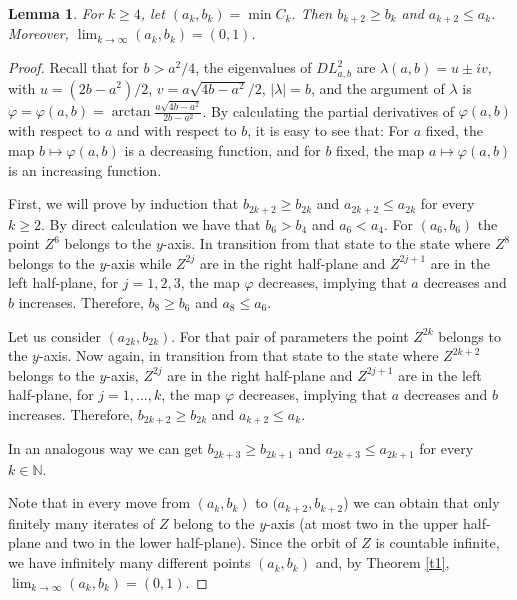 \documentclass[12pt]{amsart}
\theoremstyle{plain}
\newtheorem{lem}[theorem]{Lemma}
\theoremstyle{definition}
\def\N{{\mathbb N}}
\renewcommand{\phi}{\varphi}
\begin{document}
	\begin{lem}\label{l:ps}
		For $k \ge 4$, let $(a_k, b_k) = \min C_k$. Then $b_{k+2} \ge b_k$ and 
		$a_{k+2} \le a_k$. Moreover, $\lim_{k \to \infty}(a_k, b_k) = (0, 1)$.
	\end{lem}
	\begin{proof}
		Recall that for $b > a^2/4$, the eigenvalues of $DL^2_{a,b}$ are 
		$\lambda(a, b) = u \pm iv$, with $u = (2b - a^2)/2$, 
		$v = a\sqrt{4b-a^2}/2$, $|\lambda| = b$, and the argument of $\lambda$ 
		is $\phi = \phi(a,b) = \arctan \frac{a\sqrt{4b - a^2}}{2b - a^2}$. By 
		calculating the partial derivatives of $\phi(a,b)$ with respect to $a$ 
		and with respect to $b$, it is easy to see that: For $a$ fixed, the map
		$b \mapsto \phi(a, b)$ is a decreasing function, and for $b$ fixed, the 
		map $a \mapsto \phi(a, b)$ is an increasing function.
		
		First, we will prove by induction that $b_{2k+2} \ge b_{2k}$ and 
		$a_{2k+2} \le a_{2k}$ for every $k \ge 2$. By direct calculation we have 
		that $b_6 > b_4$ and $a_6 < a_4$. For $(a_6, b_6)$ the point $Z^6$ belongs 
		to the $y$-axis. In transition from that state to the state where $Z^8$ 
		belongs to the $y$-axis while $Z^{2j}$ are in the right half-plane and 
		$Z^{2j+1}$ are in the left half-plane, for $j = 1,2,3$, the map  $\phi$ 
		decreases, implying that $a$ decreases and $b$ increases. Therefore, 
		$b_8 \ge b_6$ and $a_8 \le a_6$. 
		
		Let us consider $(a_{2k}, b_{2k})$. 
		For that pair of parameters the point $Z^{2k}$ belongs to the $y$-axis. 
		Now again, in transition from that state to the state where  $Z^{2k+2}$ 
		belongs to the $y$-axis, $Z^{2j}$ are in the right half-plane and 
		$Z^{2j+1}$ are in the left half-plane, for $j = 1, \dots , k$, the map  
		$\phi$ decreases, implying that $a$ decreases and $b$ increases. 
		Therefore, $b_{2k+2} \ge b_{2k}$ and $a_{k+2} \le a_k$.
		
		In an analogous way we can get $b_{2k+3} \ge b_{2k+1}$ and 
		$a_{2k+3} \le a_{2k+1}$ for every $k \in \N$. 
		
		Note that in every move from $(a_k, b_k)$ to $(a_{k+2}, b_{k+2}$) we can 
		obtain that only finitely many iterates of $Z$ belong to the $y$-axis (at 
		most two in the upper half-plane and two in the lower half-plane). Since 
		the orbit of $Z$ is countable infinite, we have infinitely many different 
		points $(a_k, b_k)$ and, by Theorem \ref{t1}, 
		$\lim_{k \to \infty}(a_k, b_k) = (0, 1)$.
	\end{proof}	
	
\end{document}
